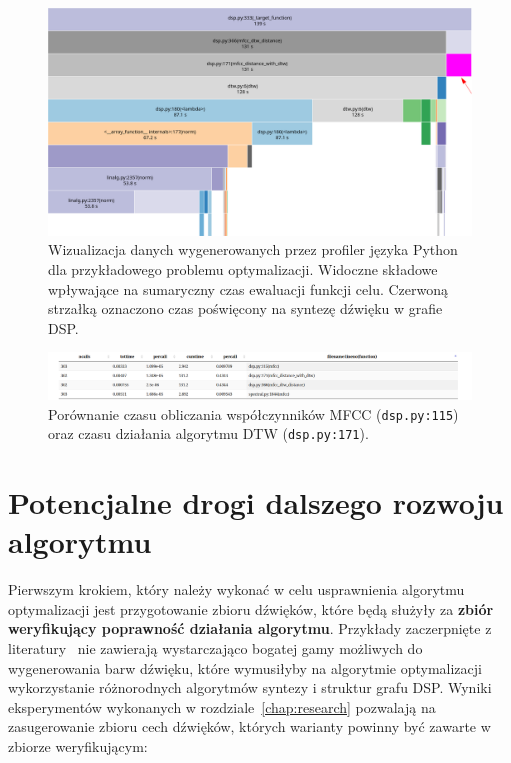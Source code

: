 \begin{figure}[H]
    \centering
    \includegraphics[width=1.0\linewidth]{rys07/profile_target_function_execution.png}
    \caption{
      Wizualizacja danych wygenerowanych przez profiler języka Python
      dla przykładowego problemu optymalizacji. Widoczne składowe wpływające
      na sumaryczny czas ewaluacji funkcji celu.
      Czerwoną strzałką oznaczono czas poświęcony
      na syntezę dźwięku w grafie DSP\@.
    }\label{fig:target_function_profiling}
\end{figure}

\begin{figure}[H]
    \centering
    \includegraphics[width=1.0\linewidth]{rys07/mfcc_search.png}
    \caption{
      Porównanie czasu obliczania współczynników MFCC (\texttt{dsp.py:115})
      oraz czasu działania algorytmu DTW (\texttt{dsp.py:171}).
    }\label{fig:mfcc_profiling}
\end{figure}


\section{Potencjalne drogi dalszego rozwoju algorytmu}\label{sec:potential_improvements}

Pierwszym krokiem, który należy wykonać w celu usprawnienia
algorytmu optymalizacji jest przygotowanie zbioru dźwięków,
które będą służyły za \textbf{zbiór weryfikujący poprawność działania algorytmu}.
Przykłady zaczerpnięte z literatury~\cite{evolutionary_puredata_results}
nie zawierają wystarczająco bogatej gamy możliwych do wygenerowania
barw dźwięku, które wymusiłyby na algorytmie optymalizacji wykorzystanie
różnorodnych algorytmów syntezy i struktur grafu DSP\@. Wyniki
eksperymentów wykonanych w rozdziale~\ref{chap:research} pozwalają
na zasugerowanie zbioru cech dźwięków, których warianty
powinny być zawarte w zbiorze weryfikującym:

